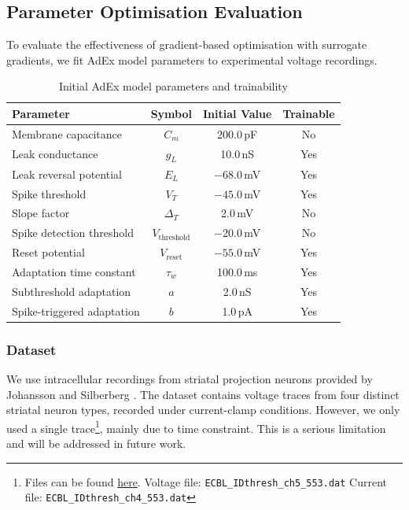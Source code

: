 \documentclass[conference]{IEEEtran}
\begin{document}
\subsection{Parameter Optimisation Evaluation}\label{sec:param_opt}
To evaluate the effectiveness of gradient-based optimisation with surrogate gradients, we fit \ac{AdEx} model parameters to experimental voltage recordings.
\begin{table}[thb]
\centering
\caption{Initial AdEx model parameters and trainability}
\label{tab:initial-params}
\begin{tabular}{lccc}
\toprule
\textbf{Parameter} & \textbf{Symbol} & \textbf{Initial Value} & \textbf{Trainable} \\
\midrule
Membrane capacitance & $C_m$ & 200.0\,pF & No \\
Leak conductance & $g_L$ & 10.0\,nS & Yes \\
Leak reversal potential & $E_L$ & $-68.0$\,mV & Yes \\
Spike threshold & $V_T$ & $-45.0$\,mV & Yes \\
Slope factor & $\Delta_T$ & 2.0\,mV & No \\
Spike detection threshold & $V_\text{threshold}$ & $-20.0$\,mV & No \\
Reset potential & $V_\text{reset}$ & $-55.0$\,mV & Yes \\
Adaptation time constant & $\tau_w$ & 100.0\,ms & Yes \\
Subthreshold adaptation & $a$ & 2.0\,nS & Yes \\
Spike-triggered adaptation & $b$ & 1.0\,pA & Yes \\
\bottomrule
\end{tabular}
\end{table}

\subsubsection{Dataset}\label{sec:data-set}
We use intracellular recordings from striatal projection neurons provided by Johansson and Silberberg \cite{Johansson2020}.
The dataset contains voltage traces from four distinct striatal neuron types, recorded under current-clamp conditions.
However, we only used a single trace\footnote{Files can be found \href{https://github.com/a1eko/humanspn/tree/df6ec55178c81e64fdcf4ae79aaa1872458c621f/models/optimisations/mCP-dspn-e150917_c6_D1-manimal_1_n24_04102017_cel1/expdata}{here}.
Voltage file: \texttt{ECBL\_IDthresh\_ch5\_553.dat}
Current file: \texttt{ECBL\_IDthresh\_ch4\_553.dat}}, mainly due to time constraint.
This is a serious limitation and will be addressed in future work.
\end{document}
